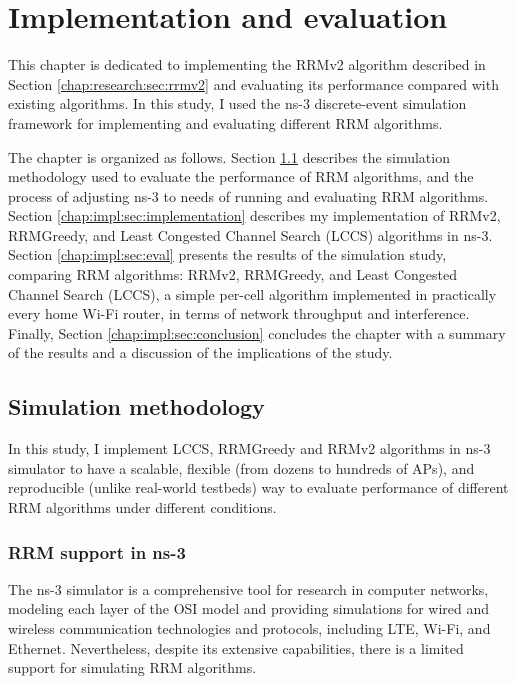 \chapter{Implementation and evaluation}
\label{chap:impl}


This chapter is dedicated to implementing the RRMv2 algorithm described in Section \ref{chap:research:sec:rrmv2} and evaluating its performance compared with existing algorithms. In this study, I used the ns-3 discrete-event simulation framework for implementing and evaluating different RRM algorithms.

The chapter is organized as follows.
Section \ref{chap:impl:sec:simulation_method} describes the simulation methodology used to evaluate the performance of RRM algorithms, and the process of adjusting ns-3 to needs of running and evaluating RRM algorithms.
Section \ref{chap:impl:sec:implementation} describes my implementation of RRMv2, RRMGreedy, and Least Congested Channel Search (LCCS) algorithms in ns-3.
Section \ref{chap:impl:sec:eval} presents the results of the simulation study, comparing RRM algorithms: RRMv2, RRMGreedy, and Least Congested Channel Search (LCCS), a simple per-cell algorithm implemented in practically every home Wi-Fi router, in terms of network throughput and interference.
Finally, Section \ref{chap:impl:sec:conclusion} concludes the chapter with a summary of the results and a discussion of the implications of the study.

\section{Simulation methodology}
\label{chap:impl:sec:simulation_method}
In this study, I implement LCCS, RRMGreedy and RRMv2 algorithms in ns-3 simulator to have a scalable, flexible (from dozens to hundreds of APs), and reproducible (unlike real-world testbeds) way to evaluate performance of different RRM algorithms under different conditions.

\subsection{RRM support in ns-3}
The ns-3 simulator is a comprehensive tool for research in computer networks, modeling each layer of the OSI model and providing simulations for wired and wireless communication technologies and protocols, including LTE, Wi-Fi, and Ethernet. Nevertheless, despite its extensive capabilities, there is a limited support for simulating RRM algorithms.

